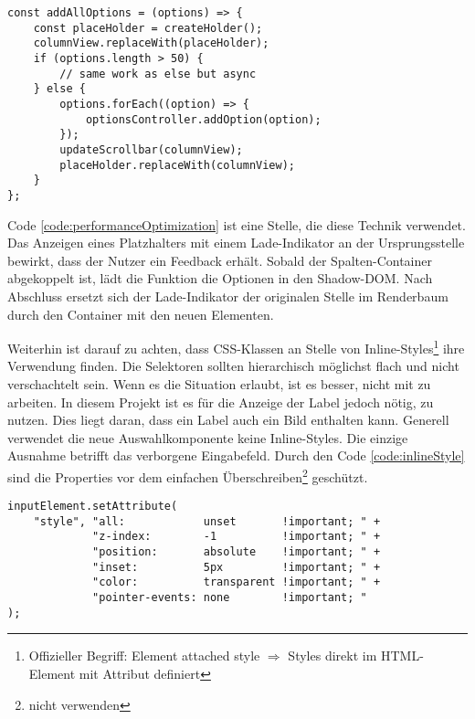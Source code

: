 \begin{lstlisting}[style = htmlcssjs, caption = Performance-Optimierung, label = code:performanceOptimization]
const addAllOptions = (options) => {
    const placeHolder = createHolder();
    columnView.replaceWith(placeHolder);
    if (options.length > 50) {
        // same work as else but async
    } else {
        options.forEach((option) => {
            optionsController.addOption(option);
        });
        updateScrollbar(columnView);
        placeHolder.replaceWith(columnView);
    }
};
\end{lstlisting}

Code \ref{code:performanceOptimization} ist eine Stelle, die diese Technik verwendet. 
Das Anzeigen eines Platzhalters mit einem Lade-Indikator an der Ursprungsstelle bewirkt, dass der Nutzer ein Feedback erhält. 
Sobald der Spalten-Container abgekoppelt ist, lädt die Funktion die Optionen in den Shadow-DOM. 
Nach Abschluss ersetzt sich der Lade-Indikator der originalen Stelle im Renderbaum durch den Container mit den neuen Elementen. 

Weiterhin ist darauf zu achten, dass CSS-Klassen an Stelle von Inline-Styles\footnote{
    Offizieller Begriff: Element attached style $\Rightarrow$ Styles direkt im HTML-Element mit Attribut  definiert
} ihre Verwendung finden. 
Die Selektoren sollten hierarchisch möglichst flach und nicht verschachtelt sein. 
Wenn es die Situation erlaubt, ist es besser, nicht mit  zu arbeiten. 
In diesem Projekt ist es für die Anzeige der Label jedoch nötig,  zu nutzen. 
Dies liegt daran, dass ein Label auch ein Bild enthalten kann. 
Generell verwendet die neue Auswahlkomponente keine Inline-Styles. 
Die einzige Ausnahme betrifft das verborgene Eingabefeld. 
Durch den Code \ref{code:inlineStyle} sind die Properties vor dem einfachen Überschreiben\footnote{
     nicht verwenden
} geschützt. 

\begin{lstlisting}[style = htmlcssjs, caption = Inline-Style für Input-Feld, label = code:inlineStyle]
inputElement.setAttribute(
    "style", "all:            unset       !important; " +
             "z-index:        -1          !important; " +
             "position:       absolute    !important; " +
             "inset:          5px         !important; " +
             "color:          transparent !important; " +
             "pointer-events: none        !important; "
);
\end{lstlisting}

